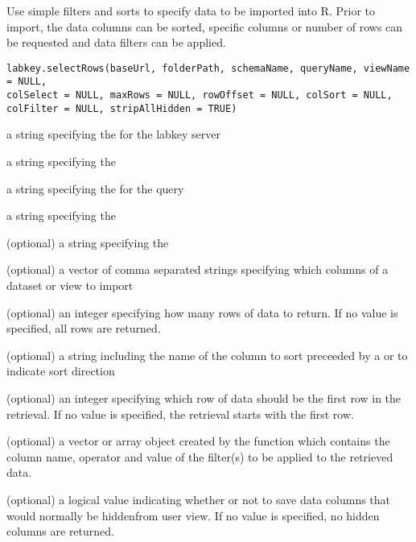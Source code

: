 \begin{Description}\relax
Use simple filters and sorts to specify data to be imported into R. Prior to import, 
the data columns can be sorted, specific columns or number of rows can be requested and
data filters can be applied.
\end{Description}
\begin{Usage}
\begin{verbatim}
labkey.selectRows(baseUrl, folderPath, schemaName, queryName, viewName = NULL, 
colSelect = NULL, maxRows = NULL, rowOffset = NULL, colSort = NULL, 
colFilter = NULL, stripAllHidden = TRUE)
\end{verbatim}
\end{Usage}
\begin{Arguments}
\begin{ldescription}
\item[\code{baseUrl}] a string specifying the for the labkey server
\item[\code{folderPath}] a string specifying the  
\item[\code{schemaName}] a string specifying the   for the query
\item[\code{queryName}] a string specifying the 
\item[\code{viewName}] (optional) a string specifying the 
\item[\code{colSelect}] (optional) a vector of comma separated strings specifying which columns of a dataset or view to import
\item[\code{maxRows}] (optional) an integer specifying how many rows of data to return. If no value is specified, all rows are returned.
\item[\code{colSort}] (optional) a string including the name of the column to sort preceeded by a \dQuote{+} or
\dQuote{-} to indicate sort direction
\item[\code{rowOffset}] (optional) an integer specifying which row of data should be the first row in the retrieval. If no
value is specified, the retrieval starts with the first row.
\item[\code{colFilter}] (optional) a vector or array object created by the  function which contains the
column name, operator and value of the filter(s) to be applied to the retrieved data.
\item[\code{stripAllHidden}] (optional) a logical value indicating whether or not to save data columns that would normally be hiddenfrom user view. If no value is specified, no hidden columns are returned.
\end{ldescription}
\end{Arguments}
